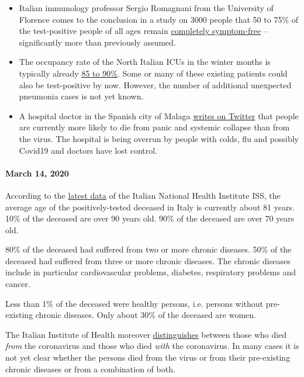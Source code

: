\begin{itemize}
\tightlist
\item
  Italian immunology professor Sergio Romagnani from the University of
  Florence comes to the conclusion in a study on 3000 people that 50 to
  75\% of the test-positive people of all ages remain
  \href{https://www.repubblica.it/salute/medicina-e-ricerca/2020/03/16/news/coronavirus_studio_il_50-75_dei_casi_a_vo_sono_asintomatici_e_molto_contagiosi-251474302/}{completely
  symptom-free} -- significantly more than previously assumed.
\item
  The occupancy rate of the North Italian ICUs in the winter months is
  typically already
  \href{https://jamanetwork.com/journals/jama/fullarticle/2763188}{85 to
  90\%}. Some or many of these existing patients could also be
  test-positive by now. However, the number of additional unexpected
  pneumonia cases is not yet known.
\item
  A hospital doctor in the Spanish city of Malaga
  \href{https://twitter.com/NeurologaenSAS/status/1239498772570308609}{writes
  on Twitter} that people are currently more likely to die from panic
  and systemic collapse than from the virus. The hospital is being
  overrun by people with colds, flu and possibly Covid19 and doctors
  have lost control.
\end{itemize}

\hypertarget{march-14-2020}{%
\paragraph{March 14, 2020}\label{march-14-2020}}

According to the
\href{https://www.epicentro.iss.it/coronavirus/sars-cov-2-decessi-italia}{latest
data} of the Italian National Health Institute ISS, the average age of
the positively-tested deceased in Italy is currently about 81 years.
10\% of the deceased are over 90 years old. 90\% of the deceased are
over 70 years old.

80\% of the deceased had suffered from two or more chronic diseases.
50\% of the deceased had suffered from three or more chronic diseases.
The chronic diseases include in particular cardiovascular problems,
diabetes, respiratory problems and cancer.

Less than 1\% of the deceased were healthy persons, i.e. persons without
pre-existing chronic diseases. Only about 30\% of the deceased are
women.

The Italian Institute of Health moreover
\href{https://youtu.be/0M4kbPDHGR0?t=210}{distinguishes} between those
who died \emph{from} the coronavirus and those who died \emph{with} the
coronavirus. In many cases it is not yet clear whether the persons died
from the virus or from their pre-existing chronic diseases or from a
combination of both.

